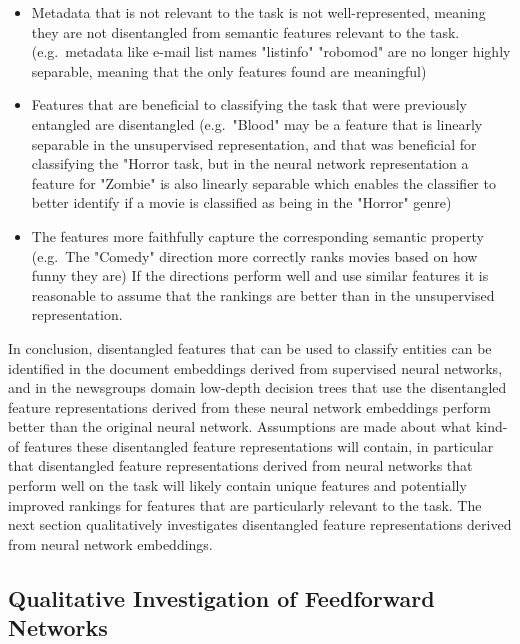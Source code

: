 \begin{itemize}
	\item Metadata that is not relevant to the task is not well-represented, meaning they are not disentangled from semantic features relevant to the task. (e.g.\ metadata like e-mail list names "listinfo" "robomod" are no longer highly separable, meaning that the only features found are meaningful)
	\item Features that are beneficial to classifying the task that were previously entangled are disentangled  (e.g.\ "Blood" may be a feature that is linearly separable in the unsupervised representation, and that was beneficial for classifying the "Horror task, but in the neural network representation a feature for "Zombie" is also linearly separable which enables the classifier to better identify if a movie is classified as being in the "Horror" genre)
	\item The features more faithfully capture the corresponding semantic property (e.g.\ The "Comedy" direction more correctly ranks movies based on how funny they are) If the directions perform well and use similar features it is reasonable to assume that the rankings are better than in the unsupervised representation.
\end{itemize}

In conclusion, disentangled features that can be used to classify entities can be identified in the document embeddings derived from supervised neural networks, and in the newsgroups domain  low-depth decision trees that use the disentangled feature representations derived from these neural network embeddings perform  better than the original neural network. Assumptions are made about what kind-of features these disentangled feature representations will contain, in particular that disentangled feature representations derived from neural networks that perform well on the task will likely contain unique features and potentially improved rankings for features that are particularly relevant to the task.  The next section qualitatively investigates  disentangled feature representations derived from neural network  embeddings.

\subsection{Qualitative Investigation of Feedforward Networks}\label{ch5:qual}


